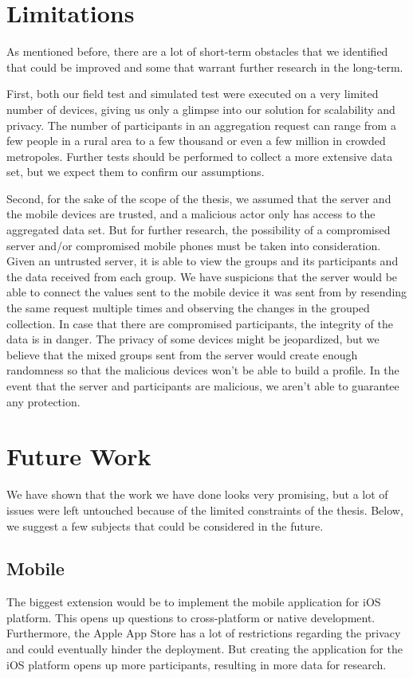\section{Limitations}
As mentioned before, there are a lot of short-term obstacles that we identified that could be improved and some that warrant further research in the long-term.

First, both our field test and simulated test were executed on a very limited number of devices, giving us only a glimpse into our solution for scalability and privacy. The number of participants in an aggregation request can range from a few people in a rural area to a few thousand or even a few million in crowded metropoles. Further tests should be performed to collect a more extensive data set, but we expect them to confirm our assumptions.

Second, for the sake of the scope of the thesis, we assumed that the server and the mobile devices are trusted, and a malicious actor only has access to the aggregated data set. But for further research, the possibility of a compromised server and/or compromised mobile phones must be taken into consideration. Given an untrusted server, it is able to view the groups and its participants and the data received from each group. We have suspicions that the server would be able to connect the values sent to the mobile device it was sent from by resending the same request multiple times and observing the changes in the grouped collection. In case that there are compromised participants, the integrity of the data is in danger. The privacy of some devices might be jeopardized, but we believe that the mixed groups sent from the server would create enough randomness so that the malicious devices won't be able to build a profile. In the event that the server and participants are malicious, we aren't able to guarantee any protection.

\section{Future Work}
We have shown that the work we have done looks very promising, but a lot of issues were left untouched because of the limited constraints of the thesis. Below, we suggest a few subjects that could be considered in the future. 

\subsection{Mobile}
The biggest extension would be to implement the mobile application for iOS platform. This opens up questions to cross-platform or native development. Furthermore, the Apple App Store has a lot of restrictions regarding the privacy and could eventually hinder the deployment. But creating the application for the iOS platform opens up more participants, resulting in more data for research.

